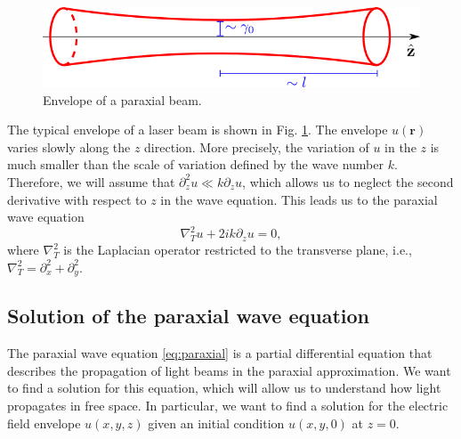 \documentclass[a4paper,10pt]{report}
\begin{document}
\begin{figure}[h]
    \includegraphics[scale=0.7]{images/feixe_paraxial.png}
    \centering
    \caption{Envelope of a paraxial beam.}
    \label{fig: paraxial beam}
\end{figure}

The typical envelope of a laser beam is shown in Fig. \ref{fig: paraxial beam}. The envelope $u(\mathbf{r})$ varies slowly along the $z$ direction. More precisely, the variation of $u$ in the $z$ is much smaller than the scale of variation defined by the wave number $k$. Therefore, we will assume that $\partial_z^2 u \ll k \partial_z u$, which allows us to neglect the second derivative with respect to $z$ in the wave equation. This leads us to the paraxial wave equation
\begin{equation}
\label{eq:paraxial}
    \nabla^2_T u + 2ik \partial_z u = 0,
\end{equation}
where $\nabla^2_T$ is the Laplacian operator restricted to the transverse plane, i.e., $\nabla^2_T = \partial_x^2 + \partial_y^2$.

\subsection{Solution of the paraxial wave equation}

The paraxial wave equation \eqref{eq:paraxial} is a partial differential equation that describes the propagation of light beams in the paraxial approximation. We want to find a solution for this equation, which will allow us to understand how light propagates in free space. In particular, we want to find a solution for the electric field envelope $u(x,y,z)$ given an initial condition $u(x,y,0)$ at $z=0$.
\end{document}
